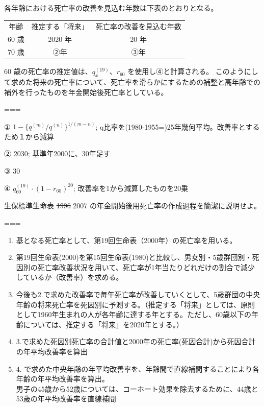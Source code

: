 \documentclass[report,gutter=10mm,fore-edge=10mm,uplatex,dvipdfmx]{jlreq}
\begin{document}
各年齢における死亡率の改善を見込む年数は下表のとおりとなる。

\begin{tabular}[]{|c|c|c|}
\hline
年齢 & 推定する「将来」 & 死亡率の改善を見込む年数\\
60 歳 & 2020 年 & 20 年\\
70 歳 & ②年 & ③年\\
\hline
\end{tabular}

60 歳の死亡率の推定値は、\(q_x^{(19)}\)、\(r_{60}\)
を使用し④と計算される。
このようにして求めた将来の死亡率について、死亡率を滑らかにするための補整と高年齢での補外を行ったものを年金開始後死亡率としている。

===

① \(1-\{q^{(m)}/q^{(n)}\}^{1/(m-n)}\);
q比率を(1980-1955=)25年幾何平均。改善率とするため１から減算

② 2030;
基準年2000に、30年足す 

③ 30

④ \(q^{(19)}_{60}\cdot(1-r_{60})^{20}\);
改善率を1から減算したものを20乗


生保標準生命表 \sout{1996} 2007 の年金開始後用死亡率の作成過程を簡潔に説明せよ。

===


\begin{enumerate}
\tightlist
\item
  基となる死亡率として、第19回生命表（2000年）の死亡率を用いる。
\item
  第19回生命表(2000)を第15回生命表(1980)と比較し、男女別・5歳群団別・死因別の死亡率改善状況を用いて、死亡率が1年当たりどれだけの割合で減少しているか（改善率）を求める。
\item
  今後も2.で求めた改善率で毎午死亡率が改善していくとして、5歳群団の中央年齢の将来死亡率を死因別に予測する。（推定する「将来」としては、原則として1960年生まれの人が各年齢に達する年とする。ただし、60歳以下の年齢については、推定する「将来」を2020年とする。）
\item
     3.で求めた死因別死亡率の合計値と2000年の死亡率(死因合計)から死因合計の年平均改善率を算出
 \item 
       4. で求めた中央年齢の年平均改善率を、年齢間で直線補間することにより各年齢の年平均改善率を算出。\\
       男子の45歳から52歳については、コーホート効果を除去するために、44歳と53歳の年平均改善率を直線補間
\end{enumerate}
\end{document}
